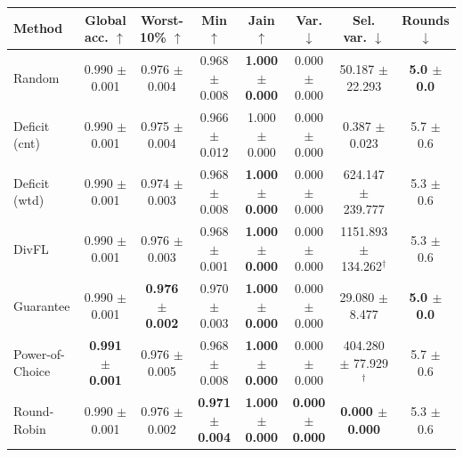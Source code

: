 \begin{tabular}{lccccccc}
\toprule
Method & Global acc. $\uparrow$ & Worst-10\% $\uparrow$ & Min $\uparrow$ & Jain $\uparrow$ & Var. $\downarrow$ & Sel. var. $\downarrow$ & Rounds $\downarrow$ \\
\midrule
Random & 0.990 $\pm$ 0.001 & 0.976 $\pm$ 0.004 & 0.968 $\pm$ 0.008 & \textbf{1.000 $\pm$ 0.000} & 0.000 $\pm$ 0.000 & 50.187 $\pm$ 22.293 & \textbf{5.0 $\pm$ 0.0} \\
Deficit (cnt) & 0.990 $\pm$ 0.001 & 0.975 $\pm$ 0.004 & 0.966 $\pm$ 0.012 & 1.000 $\pm$ 0.000 & 0.000 $\pm$ 0.000 & 0.387 $\pm$ 0.023 & 5.7 $\pm$ 0.6 \\
Deficit (wtd) & 0.990 $\pm$ 0.001 & 0.974 $\pm$ 0.003 & 0.968 $\pm$ 0.008 & \textbf{1.000 $\pm$ 0.000} & 0.000 $\pm$ 0.000 & 624.147 $\pm$ 239.777 & 5.3 $\pm$ 0.6 \\
DivFL & 0.990 $\pm$ 0.001 & 0.976 $\pm$ 0.003 & 0.968 $\pm$ 0.001 & \textbf{1.000 $\pm$ 0.000} & 0.000 $\pm$ 0.000 & 1151.893 $\pm$ 134.262$^\dagger$ & 5.3 $\pm$ 0.6 \\
Guarantee & 0.990 $\pm$ 0.001 & \textbf{0.976 $\pm$ 0.002} & 0.970 $\pm$ 0.003 & \textbf{1.000 $\pm$ 0.000} & 0.000 $\pm$ 0.000 & 29.080 $\pm$ 8.477 & \textbf{5.0 $\pm$ 0.0} \\
Power-of-Choice & \textbf{0.991 $\pm$ 0.001} & 0.976 $\pm$ 0.005 & 0.968 $\pm$ 0.008 & \textbf{1.000 $\pm$ 0.000} & 0.000 $\pm$ 0.000 & 404.280 $\pm$ 77.929$^\dagger$ & 5.7 $\pm$ 0.6 \\
Round-Robin & 0.990 $\pm$ 0.001 & 0.976 $\pm$ 0.002 & \textbf{0.971 $\pm$ 0.004} & \textbf{1.000 $\pm$ 0.000} & \textbf{0.000 $\pm$ 0.000} & \textbf{0.000 $\pm$ 0.000} & 5.3 $\pm$ 0.6 \\
\bottomrule
\end{tabular}
